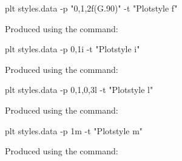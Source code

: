 \documentclass{book}
\begin{document}
\begin{figure}
\begin{center}
\end{center}
\caption[Plotstyle f]{Produced using the command:
\label{fig:style-f}}
\begin{center}
\begin{boxedverbatim}
plt styles.data -p "0,1,2f(G.90)" -t "Plotstyle f"
\end{boxedverbatim}
\end{center}
\end{figure}

\begin{figure}
\begin{center}
\end{center}
\caption[Plotstyle i]{Produced using the command:
\label{fig:style-i}}
\begin{center}
\begin{boxedverbatim}
plt styles.data -p 0,1i -t "Plotstyle i"
\end{boxedverbatim}
\end{center}
\end{figure}

\begin{figure}
\begin{center}
\end{center}
\caption[Plotstyle l]{Produced using the command:
\label{fig:style-l}}
\begin{center}
\begin{boxedverbatim}
plt styles.data -p 0,1,0,3l -t "Plotstyle l"
\end{boxedverbatim}
\end{center}
\end{figure}

\begin{figure}
\begin{center}
\end{center}
\caption[Plotstyle m]{Produced using the command:
\label{fig:style-m}}
\begin{center}
\begin{boxedverbatim}
plt styles.data -p 1m -t "Plotstyle m"
\end{boxedverbatim}
\end{center}
\end{figure}
\end{document}
